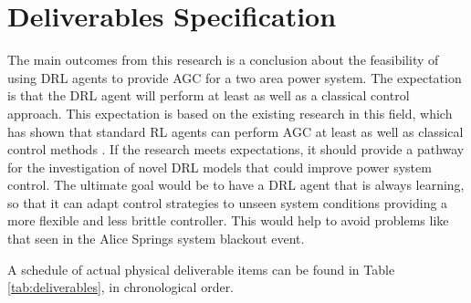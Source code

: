 \section{Deliverables Specification}
The main outcomes from this research is a conclusion about the feasibility of using DRL agents to provide AGC for a two area power system. The expectation is that the DRL agent will perform at least as well as a classical control approach. This expectation is based on the existing research in this field, which has shown that standard RL agents can perform AGC at least as well as classical control methods \cite{Ahamed2002}. If the research meets expectations, it should provide a pathway for the investigation of novel DRL models that could improve power system control. The ultimate goal would be to have a DRL agent that is always learning, so that it can adapt control strategies to unseen system conditions providing a more flexible and less brittle controller. This would help to avoid problems like that seen in the Alice Springs system blackout event.

A schedule of actual physical deliverable items can be found in Table \ref{tab:deliverables}, in chronological order.

